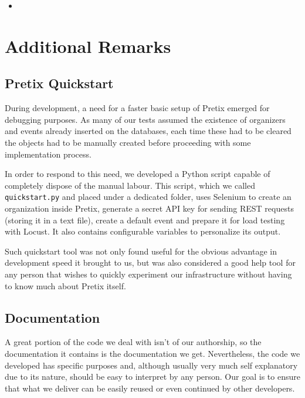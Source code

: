\documentclass[12pt]{article}
\begin{document}
\begin{itemize}
  \item
\end{itemize}

\newpage
\section{Additional Remarks} \label{remarks} %

\subsection{Pretix Quickstart} \label{remarks.quickstart} %

During development, a need for a faster basic setup of Pretix emerged for debugging purposes.
As many of our tests assumed the existence of organizers and events already inserted on the databases, each time these had to be cleared the objects had to be
manually created before proceeding with some implementation process.

In order to respond to this need, we developed a Python script capable of completely dispose of the manual labour.
This script, which we called \texttt{quickstart.py} and placed under a dedicated folder, uses Selenium \cite{selenium} to create an organization inside Pretix,
generate a secret API key for sending REST requests (storing it in a text file), create a default event and prepare it for load testing with Locust.
It also contains configurable variables to personalize its output.

Such quickstart tool was not only found useful for the obvious advantage in development speed it brought to us, but was also considered a good help tool for any
person that wishes to quickly experiment our infrastructure without having to know much about Pretix itself.

\subsection{Documentation} \label{remarks.documentation} %


A great portion of the code we deal with isn't of our authorship, so the documentation it contains is the documentation we get.
Nevertheless, the code we developed has specific purposes and, although usually very much self explanatory due to its nature, should be easy to interpret by any person.
Our goal is to ensure that what we deliver can be easily reused or even continued by other developers.
\end{document}
